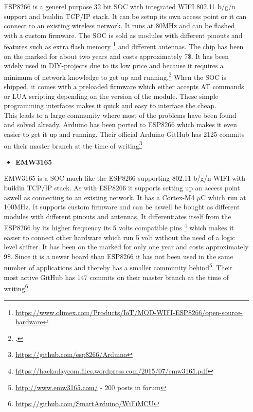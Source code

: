 ESP8266 is a generel purpose 32 bit SOC with integrated WIFI 802.11 b/g/n support and buildin TCP/IP stack. It can be setup its own access point or it can connect to an existing wireless network.
It runs at 80MHz and can be flashed with a custom firmware. 
The SOC is sold as modules with different pinouts and features such as extra flash memory \footnote{\url{https://www.olimex.com/Products/IoT/MOD-WIFI-ESP8266/open-source-hardware}} and different antennas.
The chip has been on the marked for about two years and costs approximately 7\$. 
It has been widely used in DIY-projects due to its low price and because it requires a minimum of network knowledge to get up and running.\footcite{http://www.esp8266.com/ - 43.000 posts in forum} When the SOC is shipped, it comes with a preloaded firmware which either accepts AT commands or LUA scripting depending on the version of the module. These simple programming interfaces makes it quick and easy to interface the cheap. \\
This leads to a large community where most of the problems have been found and solved already. Arduino has been ported to ESP8266 which makes it even easier to get it up and running. Their official Arduino GitHub has 2125 commits on their master branch at the time of writing\footnote{\url{https://github.com/esp8266/Arduino}} \\

\begin{itemize}
	\item \textbf{EMW3165}
\end{itemize}
EMW3165 is a SOC much like the ESP8266 supporting 802.11 b/g/n WIFI with buildin TCP/IP stack. As with ESP8266 it supports setting up an access point aswell as connecting to an existing network. It has a Cortex-M4 $\mu$C which run at 100MHz. 
It supports custom firmware and can be aswell be bought as different modules with different pinouts and antennas.
It differentiates itself from the ESP8266 by its higher frequency its 5 volts compatible pins \footnote{\url{https://hackadaycom.files.wordpress.com/2015/07/emw3165.pdf}} which makes it easier to connect other hardware which run 5 volt without the need of a logic level shifter. It has been on the marked for only one year and costs approximately 9\$. Since it is a newer board than ESP8266 it has not been used in the same number of applications and thereby has a smaller community behind\footnote{\url{http://www.emw3165.com/} - 200 posts in forum }. Their most active GitHub has 147 commits on their master branch at the time of writing\footnote{\url{https://github.com/SmartArduino/WiFiMCU}}.

